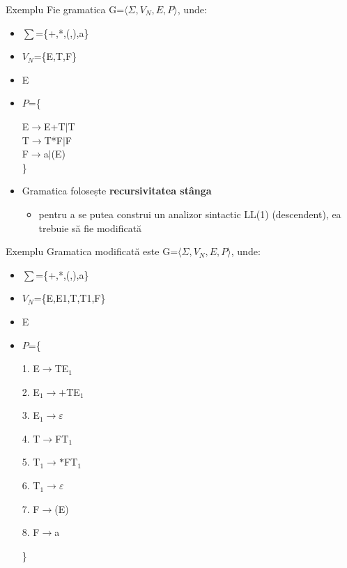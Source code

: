 \documentclass[pdf]{beamer}
\begin{document}
\begin{frame}{Exemplu}
Fie gramatica G=$\langle \Sigma, V_N, E, P \rangle$, unde:

\begin{itemize}
\item
$\sum$=\{+,*,(,),a\}
\item
$V_N$=\{E,T,F\}
\item
E
\item
$P$=\{

\hspace{1cm} E$\to$E+T$\mid$T\\
\hspace{1cm} T$\to$T*F$\mid$F\\
\hspace{1cm} F$\to$a$\mid$(E)\\
\}
\end{itemize}

\begin{itemize}
\item
Gramatica folosește \textbf{recursivitatea stânga}
\begin{itemize}
\item
pentru a se putea construi un analizor sintactic LL(1) (descendent), ea trebuie să fie modificată
\end{itemize}
\end{itemize}
\end{frame}



\begin{frame}{Exemplu}
Gramatica modificată este G=$\langle \Sigma, V_N, E, P \rangle$, unde:

\begin{itemize}
\item
$\sum$=\{+,*,(,),a\}
\item
$V_N$=\{E,E1,T,T1,F\}
\item
E
\item
$P$=\{

\hspace{1cm} 1. E$\rightarrow$TE$_1$

\hspace{1cm} 2. E$_1\rightarrow+$TE$_1$

\hspace{1cm} 3. E$_1\rightarrow \varepsilon$

\hspace{1cm} 4. T$\rightarrow$FT$_1$

\hspace{1cm} 5. T$_1\rightarrow *$FT$_1$

\hspace{1cm} 6. T$_1 \rightarrow \varepsilon$

\hspace{1cm} 7. F$ \rightarrow$(E)

\hspace{1cm} 8. F$ \rightarrow$a

\}
\end{itemize}

\end{frame}
\end{document}
